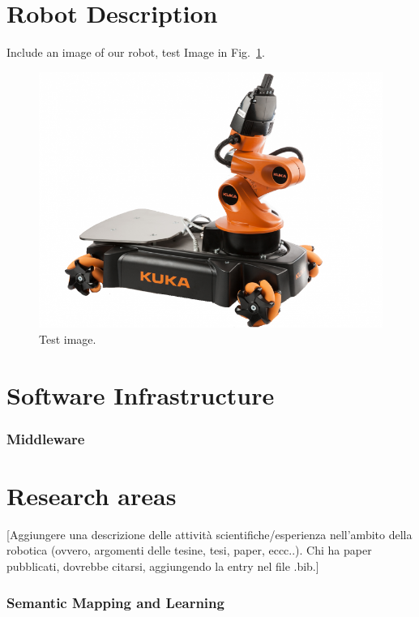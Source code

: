 \documentclass[conference]{IEEEtran}
\begin{document}
\section{Robot Description}
Include an image of our robot, test Image in Fig.~\ref{fig:test_img}.\\
\begin{figure}[t!]
\begin{center}
\includegraphics[angle=0,width=\linewidth]{images/test_img.png}
\end{center}
\caption{Test image.}\label{fig:test_img}
\end{figure}

\section{Software Infrastructure}
\subsubsection{Middleware}

\section{Research areas}

[Aggiungere una descrizione delle attività scientifiche/esperienza nell'ambito della robotica (ovvero, argomenti delle tesine, tesi, paper, eccc..). Chi ha paper pubblicati, dovrebbe citarsi, aggiungendo la entry nel file .bib.]
\subsubsection{Semantic Mapping and Learning}
\end{document}
